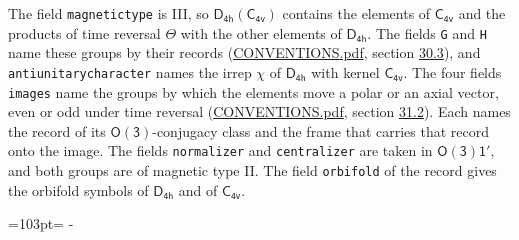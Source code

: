 \documentclass[10pt,a4paper]{article}
\newcommand{\needspace}[1]{\par\penalty-100\begingroup\dimen0=#1\relax\dimen2=\pagegoal
  \advance\dimen2-\pagetotal\ifdim\dimen0>\dimen2\relax\ifdim\dimen2>0pt\vfil\break\fi\fi
  \endgroup}
\numberwithin{equation}{section}
\newcommand{\grp}[1]{\mathsf{#1}}
\begin{document}
The field \texttt{magnetictype} is III, so $\grp{D_{4h}}(\grp{C_{4v}})$ contains the elements of $\grp{C_{4v}}$ and the products of time reversal $\varTheta$ with the other elements of $\grp{D_{4h}}$. The fields \texttt{G} and \texttt{H} name these groups by their records (\href{../../CONVENTIONS.pdf}{CONVENTIONS.pdf}, section \href{../../CONVENTIONS.pdf\#conv.30.3}{30.3}), and \texttt{antiunitarycharacter} names the irrep $\chi$ of $\grp{D_{4h}}$ with kernel $\grp{C_{4v}}$. The four fields \texttt{images} name the groups by which the elements move a polar or an axial vector, even or odd under time reversal (\href{../../CONVENTIONS.pdf}{CONVENTIONS.pdf}, section \href{../../CONVENTIONS.pdf\#conv.31.2}{31.2}). Each names the record of its $\grp{O(3)}$-conjugacy class and the frame that carries that record onto the image. The fields \texttt{normalizer} and \texttt{centralizer} are taken in $\grp{O(3)1'}$, and both groups are of magnetic type II. The field \texttt{orbifold} of the record gives the orbifold symbols of $\grp{D_{4h}}$ and of $\grp{C_{4v}}$.
\needspace{103pt}
\end{document}
